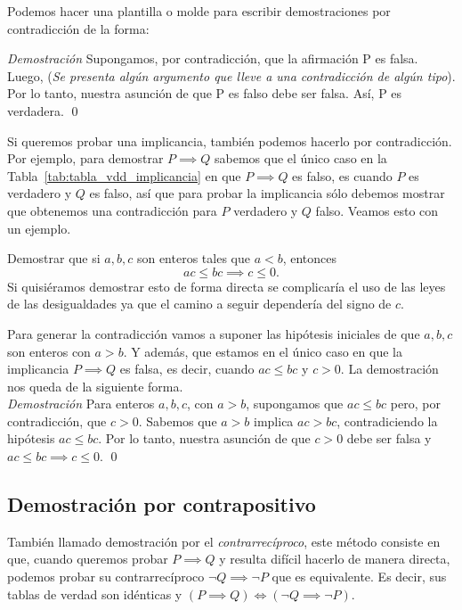 \documentclass[12pt]{book}
\begin{document}
Podemos hacer una plantilla o molde para escribir demostraciones por contradicción de la forma:

\begin{tcolorbox}
    \textit{Demostración} Supongamos, por contradicción, que la afirmación P es falsa. Luego, (\textit{Se presenta algún argumento que lleve a una contradicción de algún tipo}). Por lo tanto, nuestra asunción de que P es falso debe ser falsa. Así, P es verdadera. \qed
\end{tcolorbox}

Si queremos probar una implicancia, también podemos hacerlo por contradicción. Por ejemplo, para demostrar $P\implies Q$ sabemos que el único caso en la Tabla~\ref{tab:tabla_vdd_implicancia} en que $P\implies Q$ es falso, es cuando $P$ es verdadero y $Q$ es falso, así que para probar la implicancia sólo debemos mostrar que obtenemos una contradicción para $P$ verdadero y $Q$ falso. Veamos esto con un ejemplo.

\begin{exampleenv}
    Demostrar que si $a,b,c$ son enteros tales que $a<b$, entonces
    \[
    ac\leq bc\implies c\leq 0.
    \]
    Si quisiéramos demostrar esto de forma directa se complicaría el uso de las leyes de las desigualdades ya que el camino a seguir dependería del signo de $c$.

    Para generar la contradicción vamos a suponer las hipótesis iniciales de que $a,b,c$ son enteros con $a>b$. Y además, que estamos en el único caso en que la implicancia $P\implies Q$ es falsa, es decir, cuando $ac\leq bc$ y $c>0$. La demostración nos queda de la siguiente forma.\\

    \textit{Demostración} Para enteros $a, b, c$, con $a>b$, supongamos que $ac\leq bc$ pero, por contradicción, que $c>0$. Sabemos que $a>b$ implica $ac>bc$, contradiciendo la hipótesis $ac\leq bc$. Por lo tanto, nuestra asunción de que $c>0$ debe ser falsa y $ac\leq bc\implies c\leq 0$. \qed 
        
\end{exampleenv}

\subsection{Demostración por contrapositivo}
\noindent
También llamado demostración por el \textit{contrarrecíproco}, este método consiste en que, cuando queremos probar $P\implies Q$ y resulta difícil hacerlo de manera directa, podemos probar su contrarrecíproco \hyperref[tab:tabla_vdd_contrapos]{$\neg Q\implies \neg P$} que es equivalente. Es decir, sus tablas de verdad son idénticas y $(P\implies Q) \iff(\neg Q\implies \neg P)$.
\end{document}
